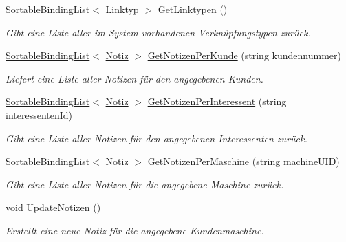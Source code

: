 \begin{DoxyCompactItemize}
\hyperlink{class_products_1_1_common_1_1_sortable_binding_list}{Sortable\+Binding\+List}$<$ \hyperlink{class_products_1_1_model_1_1_entities_1_1_linktyp}{Linktyp} $>$ \hyperlink{class_products_1_1_model_1_1_model_service_a22546c98639062d12fef4238095235cf}{Get\+Linktypen} ()
\begin{DoxyCompactList}\small\item\em Gibt eine Liste aller im System vorhandenen Verknüpfungstypen zurück. \end{DoxyCompactList}\item 
\hyperlink{class_products_1_1_common_1_1_sortable_binding_list}{Sortable\+Binding\+List}$<$ \hyperlink{class_products_1_1_model_1_1_entities_1_1_notiz}{Notiz} $>$ \hyperlink{class_products_1_1_model_1_1_model_service_ad4d1c2f5ccdc97a98098eef5a2364892}{Get\+Notizen\+Per\+Kunde} (string kundennummer)
\begin{DoxyCompactList}\small\item\em Liefert eine Liste aller Notizen für den angegebenen Kunden. \end{DoxyCompactList}\item 
\hyperlink{class_products_1_1_common_1_1_sortable_binding_list}{Sortable\+Binding\+List}$<$ \hyperlink{class_products_1_1_model_1_1_entities_1_1_notiz}{Notiz} $>$ \hyperlink{class_products_1_1_model_1_1_model_service_ac0ad4ec684c8d644d9c2980a06babfb4}{Get\+Notizen\+Per\+Interessent} (string interessenten\+Id)
\begin{DoxyCompactList}\small\item\em Gibt eine Liste aller Notizen für den angegebenen Interessenten zurück. \end{DoxyCompactList}\item 
\hyperlink{class_products_1_1_common_1_1_sortable_binding_list}{Sortable\+Binding\+List}$<$ \hyperlink{class_products_1_1_model_1_1_entities_1_1_notiz}{Notiz} $>$ \hyperlink{class_products_1_1_model_1_1_model_service_a46231427eb26bbff9b48cc9af3c23308}{Get\+Notizen\+Per\+Maschine} (string machine\+U\+ID)
\begin{DoxyCompactList}\small\item\em Gibt eine Liste aller Notizen für die angegebene Maschine zurück. \end{DoxyCompactList}\item 
void \hyperlink{class_products_1_1_model_1_1_model_service_a28300ea5061fa4af055347c760a0086b}{Update\+Notizen} ()
\begin{DoxyCompactList}\small\item\em Erstellt eine neue Notiz für die angegebene Kundenmaschine. \end{DoxyCompactList}\item 

\end{DoxyCompactItemize}

